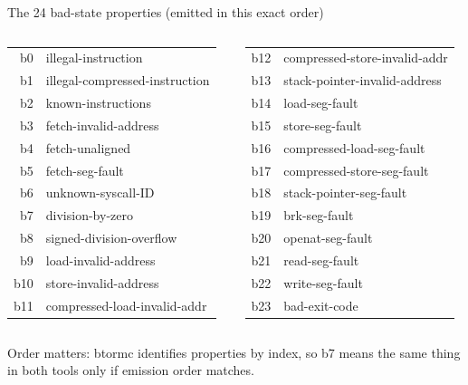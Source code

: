 \documentclass[aspectratio=169]{beamer}
\newcommand{\lab}[1]{{\footnotesize\color{ink!65}#1}}
\begin{document}
\begin{frame}{The 24 bad-state properties (emitted in this exact order)}
  \scriptsize
  \begin{columns}[T]
    \begin{tabular}{rl}
      b0 & illegal-instruction\\
      b1 & illegal-compressed-instruction\\
      b2 & known-instructions\\
      b3 & fetch-invalid-address\\
      b4 & fetch-unaligned\\
      b5 & fetch-seg-fault\\
      b6 & unknown-syscall-ID\\
      b7 & division-by-zero\\
      b8 & signed-division-overflow\\
      b9 & load-invalid-address\\
      b10 & store-invalid-address\\
      b11 & compressed-load-invalid-addr\\
    \end{tabular}
    \begin{tabular}{rl}
      b12 & compressed-store-invalid-addr\\
      b13 & stack-pointer-invalid-address\\
      b14 & load-seg-fault\\
      b15 & store-seg-fault\\
      b16 & compressed-load-seg-fault\\
      b17 & compressed-store-seg-fault\\
      b18 & stack-pointer-seg-fault\\
      b19 & brk-seg-fault\\
      b20 & openat-seg-fault\\
      b21 & read-seg-fault\\
      b22 & write-seg-fault\\
      b23 & bad-exit-code\\
    \end{tabular}
  \end{columns}
  \vspace{0.4em}
  \lab{Order matters: btormc identifies properties by index, so b7 means the
       same thing in both tools only if emission order matches.}
\end{frame}
\end{document}
